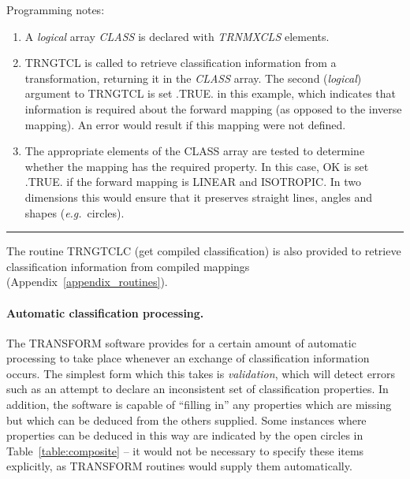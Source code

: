 \documentclass[twoside,11pt]{article}
\renewcommand{\_}{\texttt{\symbol{95}}}
\newcommand{\name}[1]{\mbox{\small{#1}}}
\newcommand{\fortvar}[1]{\mbox{\emph{#1}}}
\newcommand{\exampledone}[0]{\begin{center} \rule{6em}{0.2mm} \end{center}}
\begin{document}
Programming notes:

\begin{enumerate}

\item A \emph{logical} array \fortvar{CLASS} is declared with
\fortvar{TRN\_\_MXCLS} elements.

\item \name{TRN\_GTCL} is called to retrieve classification information from
a transformation, returning it in the \fortvar{CLASS} array.
The second (\emph{logical}) argument to \name{TRN\_GTCL} is set \name{.TRUE.}
in this example, which indicates that information is required about the
forward mapping (as opposed to the inverse mapping).
An error would result if this mapping were not defined.

\item The appropriate elements of the \name{CLASS} array are tested to
determine whether the mapping has the required property.
In this case, \name{OK} is set \name{.TRUE.} if the forward mapping is
\name{LINEAR} and \name{ISOTROPIC}.
In two dimensions this would ensure that it preserves straight lines, angles
and shapes (\emph{e.g.}\ circles).

\end{enumerate}
\exampledone

The routine \name{TRN\_GTCLC} (get compiled classification) is also provided
to retrieve classification information from compiled mappings
(Appendix~\ref{appendix_routines}).

\paragraph{Automatic classification processing.}
The \name{TRANSFORM} software provides for a certain amount of automatic
processing to take place whenever an exchange of classification information
occurs.
The simplest form which this takes is \emph{validation}, which will detect
errors such as an attempt to declare an inconsistent set of classification
properties.
In addition, the software is capable of ``filling in'' any properties which
are missing but which can be deduced from the others supplied.
Some instances where properties can be deduced in this way are indicated by
the open circles in Table~\ref{table:composite} -- it would not be
necessary to specify these items explicitly, as \name{TRANSFORM} routines
would supply them automatically.
\end{document}
